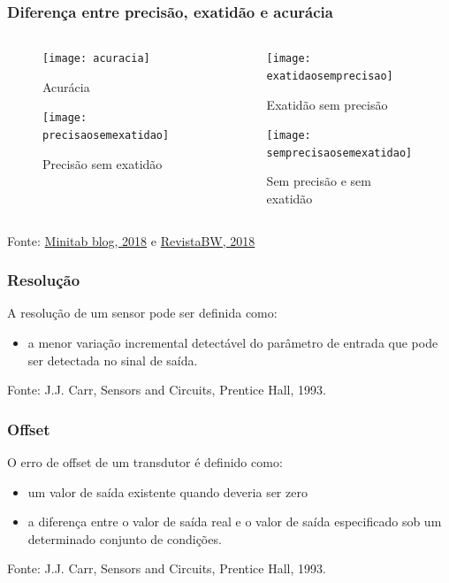 \documentclass[t]{beamer}
\begin{document}
\begin{frame}
\frametitle{Diferença entre precisão, exatidão e acurácia}
\begin{columns}
	\begin{column}{0.5\textwidth}
		\begin{figure}
			\texttt{[image: acuracia]}
			\caption{Acurácia}
			
			\texttt{[image: precisaosemexatidao]}
			\caption{Precisão sem exatidão}
		\end{figure}
	\end{column}
	\begin{column}{0.5\textwidth}
		\begin{figure}
			\texttt{[image: exatidaosemprecisao]}
			\caption{Exatidão sem precisão}
			
			\texttt{[image: semprecisaosemexatidao]}
			\caption{Sem precisão e sem exatidão}
		\end{figure}
	\end{column}
\end{columns}
{\scriptsize Fonte: \href{http://blog.minitab.com/blog/real-world-quality-improvement/accuracy-vs-precision-whats-the-difference}{Minitab blog, 2018} e \href{http://www.revistabw.com.br/revistabw/probabilidade-e-estatistica-acuracia-precisao-e-exatidao/}{RevistaBW, 2018}}
\end{frame}

\begin{frame}
	\frametitle{Resolução}
	A resolução de um sensor pode ser definida como:
	\begin{itemize}
		\item a menor variação incremental detectável do parâmetro de entrada que pode ser detectada no sinal de saída.
	\end{itemize}
	
	{\scriptsize Fonte: J.J. Carr, Sensors and Circuits, Prentice Hall, 1993.}
\end{frame}

\begin{frame}
		\frametitle{Offset}
		O erro de offset de um transdutor é definido como:
		\begin{itemize}
			\item um valor de saída existente quando deveria ser zero
			\item a diferença entre o valor de saída real e o valor de saída especificado sob um determinado conjunto de condições.
		\end{itemize}  	
		{\scriptsize Fonte: J.J. Carr, Sensors and Circuits, Prentice Hall, 1993.}
\end{frame}
\end{document}
